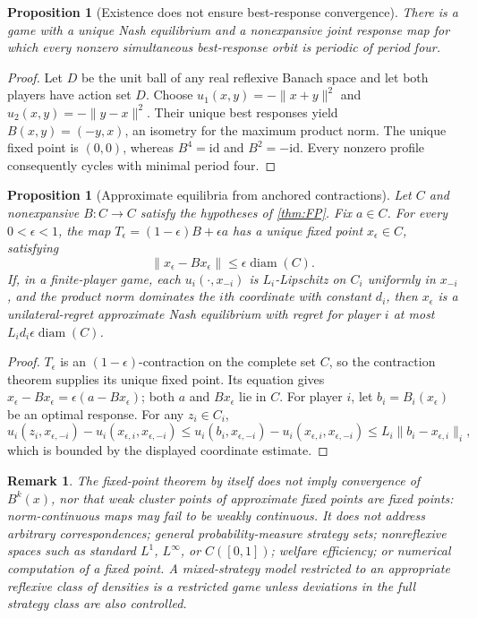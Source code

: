 \documentclass[11pt]{article}
\newtheorem{proposition}[theorem]{Proposition}
\newtheorem{remark}[theorem]{Remark}
\theoremstyle{definition}\newtheorem{definition}[theorem]{Definition}
\begin{document}
\begin{proposition}[Existence does not ensure best-response convergence\label{prop:cycles}]
There is a game with a unique Nash equilibrium and a nonexpansive joint response map for which every nonzero simultaneous best-response orbit is periodic of period four.
\end{proposition}
\begin{proof}
Let $D$ be the unit ball of any real reflexive Banach space and let both players have action set $D$. Choose $u_1(x,y)=-\|x+y\|^2$ and $u_2(x,y)=-\|y-x\|^2$. Their unique best responses yield $B(x,y)=(-y,x)$, an isometry for the maximum product norm. The unique fixed point is $(0,0)$, whereas $B^4=\mathrm{id}$ and $B^2=-\mathrm{id}$. Every nonzero profile consequently cycles with minimal period four.
\end{proof}

\begin{proposition}[Approximate equilibria from anchored contractions\label{prop:approx}]
Let $C$ and nonexpansive $B:C\to C$ satisfy the hypotheses of \cref{thm:FP}. Fix $a\in C$. For every $0<\epsilon<1$, the map $T_\epsilon=(1-\epsilon)B+\epsilon a$ has a unique fixed point $x_\epsilon\in C$, satisfying
\[\|x_\epsilon-Bx_\epsilon\|\le\epsilon\operatorname{diam}(C).\]
If, in a finite-player game, each $u_i(\cdot,x_{-i})$ is $L_i$-Lipschitz on $C_i$ uniformly in $x_{-i}$, and the product norm dominates the $i$th coordinate with constant $d_i$, then $x_\epsilon$ is a unilateral-regret approximate Nash equilibrium with regret for player $i$ at most $L_i d_i\epsilon\operatorname{diam}(C)$.
\end{proposition}
\begin{proof}
$T_\epsilon$ is an $(1-\epsilon)$-contraction on the complete set $C$, so the contraction theorem supplies its unique fixed point. Its equation gives $x_\epsilon-Bx_\epsilon=\epsilon(a-Bx_\epsilon)$; both $a$ and $Bx_\epsilon$ lie in $C$. For player $i$, let $b_i=B_i(x_\epsilon)$ be an optimal response. For any $z_i\in C_i$,
\[u_i(z_i,x_{\epsilon,-i})-u_i(x_{\epsilon,i},x_{\epsilon,-i})\le u_i(b_i,x_{\epsilon,-i})-u_i(x_{\epsilon,i},x_{\epsilon,-i})\le L_i\|b_i-x_{\epsilon,i}\|_i,\]
which is bounded by the displayed coordinate estimate.
\end{proof}
\begin{remark}
The fixed-point theorem by itself does not imply convergence of $B^k(x)$, nor that weak cluster points of approximate fixed points are fixed points: norm-continuous maps may fail to be weakly continuous. It does not address arbitrary correspondences; general probability-measure strategy sets; nonreflexive spaces such as standard $L^1$, $L^\infty$, or $C([0,1])$; welfare efficiency; or numerical computation of a fixed point. A mixed-strategy model restricted to an appropriate reflexive class of densities is a restricted game unless deviations in the full strategy class are also controlled.
\end{remark}
\end{document}
